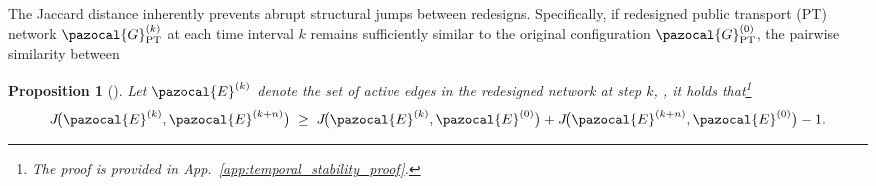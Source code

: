 \documentclass[a4paper,fleqn]{cas-sc}
\newtheorem{proposition}{Proposition}
\begin{document}
The Jaccard distance inherently prevents abrupt structural jumps between redesigns.
Specifically, if redesigned public transport (PT) network $\pazocal{G}_\text{PT}^{(k)}$ at each time interval $k$ remains sufficiently similar to the original configuration $\pazocal{G}_\text{PT}^{(0)}$,
the pairwise similarity between 
%
\begin{proposition}[]
\label{prop:temporal_stability}
Let $\pazocal{E}^{(k)}$ denote the set of active edges in the redesigned network at step $k$, , it holds that\footnote{The proof is provided in App.~\ref{app:temporal_stability_proof}.}
\[
J\!\bigl(\pazocal{E}^{(k)},\pazocal{E}^{(k+n)}\bigr) \;\ge\; J\!\bigl(\pazocal{E}^{(k)},\pazocal{E}^{(0)}\bigr) + J\!\bigl(\pazocal{E}^{(k+n)},\pazocal{E}^{(0)}\bigr) - 1.
\]
\end{proposition}

\end{document}
